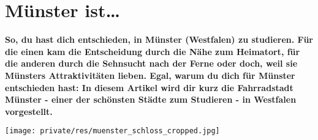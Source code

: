 \section{Münster ist\dots}
\textbf{So, du hast dich entschieden, in Münster (Westfalen) zu studieren.
	Für die einen kam die Entscheidung durch die Nähe zum Heimatort, für die anderen durch die Sehnsucht nach der Ferne oder doch, weil sie Münsters Attraktivitäten lieben.
	Egal, warum du dich für Münster entschieden hast: In diesem Artikel wird dir kurz die Fahrradstadt Münster - einer der schönsten Städte zum Studieren - in Westfalen vorgestellt.}

\begin{center}
	\texttt{[image: private/res/muenster\_schloss\_cropped.jpg]}
\end{center}

